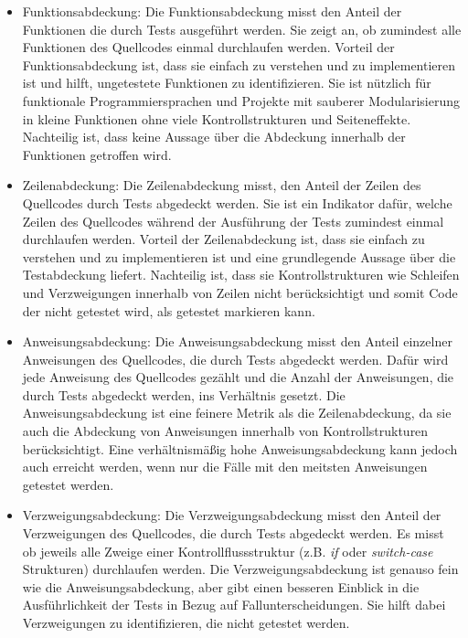 \begin{itemize}
    \item 
    Funktionsabdeckung: Die Funktionsabdeckung misst den Anteil der Funktionen die durch Tests ausgeführt werden.
    Sie zeigt an, ob zumindest alle Funktionen des Quellcodes einmal durchlaufen werden.
    Vorteil der Funktionsabdeckung ist, dass sie einfach zu verstehen und zu implementieren ist und hilft, ungetestete Funktionen zu identifizieren.
    Sie ist nützlich für funktionale Programmiersprachen und Projekte mit sauberer Modularisierung in kleine Funktionen ohne viele Kontrollstrukturen und Seiteneffekte.
    Nachteilig ist, dass keine Aussage über die Abdeckung innerhalb der Funktionen getroffen wird.
    \item
    Zeilenabdeckung: Die Zeilenabdeckung misst, den Anteil der Zeilen des Quellcodes durch Tests abgedeckt werden.
    Sie ist ein Indikator dafür, welche Zeilen des Quellcodes während der Ausführung der Tests zumindest einmal durchlaufen werden.
    Vorteil der Zeilenabdeckung ist, dass sie einfach zu verstehen und zu implementieren ist und eine grundlegende Aussage über die Testabdeckung liefert.
    Nachteilig ist, dass sie Kontrollstrukturen wie Schleifen und Verzweigungen innerhalb von Zeilen nicht berücksichtigt und somit Code der nicht getestet wird, als getestet markieren kann.
    \item
    Anweisungsabdeckung: Die Anweisungsabdeckung misst den Anteil einzelner Anweisungen des Quellcodes, die durch Tests abgedeckt werden.
    Dafür wird jede Anweisung des Quellcodes gezählt und die Anzahl der Anweisungen, die durch Tests abgedeckt werden, ins Verhältnis gesetzt.
    Die Anweisungsabdeckung ist eine feinere Metrik als die Zeilenabdeckung, da sie auch die Abdeckung von Anweisungen innerhalb von Kontrollstrukturen berücksichtigt.
    Eine verhältnismäßig hohe Anweisungsabdeckung kann jedoch auch erreicht werden, wenn nur die Fälle mit den meitsten Anweisungen getestet werden.
    \item 
    Verzweigungsabdeckung: Die Verzweigungsabdeckung misst den Anteil der Verzweigungen des Quellcodes, die durch Tests abgedeckt werden.
    Es misst ob jeweils alle Zweige einer Kontrollflussstruktur (z.B. \textit{if} oder \textit{switch-case} Strukturen) durchlaufen werden.
    Die Verzweigungsabdeckung ist genauso fein wie die Anweisungsabdeckung, aber gibt einen besseren Einblick in die Ausführlichkeit der Tests in Bezug auf Fallunterscheidungen.
    Sie hilft dabei Verzweigungen zu identifizieren, die nicht getestet werden.

\end{itemize}
